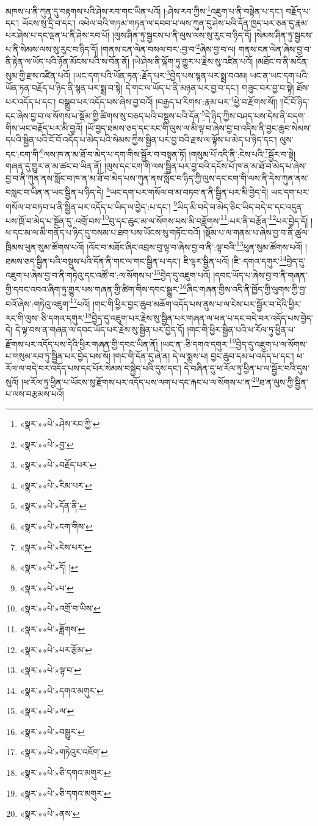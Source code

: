 མཁས་པ་ནི་ཀུན་དུ་བརྟགས་པའི་ཤེས་རབ་གང་ཡིན་པའོ། །:ཤེས་རབ་ཀྱིས་\footnote{«སྣར་»«པེ་»ཤེས་རབ་ཀྱི་}འཇུག་པ་ནི་བསྟེན་པ་དང་། བརྗོད་པ་དང་། ཡོངས་སུ་དྲི་བ་དང་། འཕེལ་བའི་གཏམ་གཏན་ལ་དབབ་པ་ལས་ཀུན་དུ་ཤེས་པའི་དོན་ཁྱད་པར་ཅན་དུ་རྣམ་པར་ཤེས་པ་དང་ལྡན་པ་ནི་ཤེས་རབ་པོ། །ལུས་ཤིན་ཏུ་སྦྱངས་པ་ནི་ལུས་ལས་སུ་རུང་བ་ཉིད་དོ། །སེམས་ཤིན་ཏུ་སྦྱངས་པ་ནི་སེམས་ལས་སུ་རུང་བ་ཉིད་དོ། །གནས་ངན་ལེན་བསལ་བར་:བྱ་བ་\footnote{«སྣར་»«པེ་»བྱ་}ཞེས་བྱ་བ་ལ། གནས་ངན་ལེན་ཞེས་བྱ་བ་ནི་རྟེན་ལ་ཡོད་པའི་ཉོན་མོངས་པའི་ས་བོན་ནོ། །ཡེ་ཤེས་ནི་ལྐོག་ཏུ་གྱུར་པ་རྗེས་སུ་འཛིན་པའོ། །མཐོང་བ་ནི་མངོན་སུམ་གྱི་རྫས་འཛིན་པའོ། །ཡང་དག་པའི་ཡོན་ཏན་:རྗོད་པར་\footnote{«སྣར་»«པེ་»བརྗོད་པར་}བྱེད་པས་སྙན་པར་སྨྲ་བའམ། ཡང་ན་ཡང་དག་པའི་ཡོན་ཏན་བརྗོད་པ་ཉིད་ནི་སྙན་པར་སྨྲ་བ་སྟེ། དེ་གང་ལ་ཡོད་པ་ནི་མཉན་པར་བྱ་བ་དང་། གཟུང་བར་བྱ་བ་སྟེ། ཐོས་པར་འདོད་པ་དང་། བསྒྲུབ་པར་འདོད་པས་ཞེས་བྱ་བའོ། །བརྒྱད་པ་རིགས་:རྣམ་པར་\footnote{«སྣར་»«པེ་»རིམ་པར་}ཕྱེ་བ་རྫོགས་སོ།། །།ངོ་བོ་ཉིད་དང་ཞེས་བྱ་བ་ལ་སོགས་པ་སྡོམ་གྱི་ཚིགས་སུ་བཅད་པའི་བསྡུས་པའི་དོན་\footnote{«སྣར་»«པེ་»དོན་ནི་}དེ་ཉིད་ཀྱིས་བཤད་པས་དེས་ནི་བདག་གིས་ཡང་བརྗོད་པར་མི་བྱའོ། །ཡོ་བྱད་ཐམས་ཅད་དང་རང་གི་ལུས་ལ་མི་ལྟ་བ་ཞེས་བྱ་བ་འདིས་ནི་བྱང་ཆུབ་སེམས་དཔའི་སྦྱིན་པའི་ངོ་བོ་འདོད་པ་མེད་པའི་སེམས་ཀྱིས་སྦྱིན་པར་བྱ་བའི་རྫས་ལ་ལྟོས་པ་མེད་པ་ཉིད་དང་། ལུས་དང་:ངག་གི་\footnote{«སྣར་»«པེ་»ངག་གིས་}ལས་ཁ་ན་མ་ཐོ་བ་མེད་པ་དག་གིས་སྦྱོར་བ་བསྟན་ཏོ། །གསུམ་པོ་འདི་ནི་:ངེས་པའི་\footnote{«སྣར་»«པེ་»ངེས་པར་}སྦྱོར་བ་སྟེ། གཞན་དུ་གྱུར་ན་མ་ཚང་བ་ཡིན་ནོ། །ལུས་དང་ངག་གི་ལས་སྦྱིན་པར་བྱ་བའི་དངོས་པོ་ཁ་ན་མ་ཐོ་བ་མེད་པ་ཞེས་བྱ་བ་ནི་ཀུན་ནས་སློང་བ་ཁ་ན་མ་ཐོ་བ་མེད་པས་ཀུན་ནས་སློང་བ་ཉིད་ཀྱི་ལུས་དང་ངག་གི་ལས་ནི་དེས་ཀུན་ནས་བསླང་བ་ཡིན་ན་ཡང་སྦྱིན་པ་ཉིད་དེ། \footnote{«སྣར་»«པེ་»དོ། ། }ཡང་དག་པར་གསོལ་བ་མ་བཏབ་ན་ནི་སྦྱིན་པར་མི་བྱེད་དེ། ཡང་དག་པར་གསོལ་བ་བཏབ་པ་ནི་སྦྱིན་པར་འདོད་པ་ཡིད་ལ་བྱེད་:པ་དང་། \footnote{«སྣར་»«པེ་»པ་}ཡིད་མི་བདེ་བ་མེད་ཅིང་ཡིད་བདེ་བ་དང་འདུན་པས་ཁྲོ་བ་མེད་པ་སྔོན་དུ་:འགྲོ་བས་\footnote{«སྣར་»«པེ་»འགྲོ་བ་ཡིས་}བུ་དང་ཆུང་མ་ལ་སོགས་པས་མི་བཟློགས་\footnote{«སྣར་»«པེ་»ཟློགས་}:པར་ནི་བརྩོན་\footnote{«སྣར་»«པེ་»པར་རྩོམ་}པར་བྱེད་དོ། །ཕ་དང་མ་ལ་མི་གནོད་པ་ཉིད་དུ་བསམ་པ་ཐག་པས་ཡོངས་སུ་གཏོང་བའོ། །སྡོམ་པ་ལ་གནས་པ་ཞེས་བྱ་བ་ནི་ཚུལ་ཁྲིམས་ཕུན་སུམ་ཚོགས་པའོ། །འོང་བ་མཐོང་ཞིང་འབྲས་བུ་ལྟ་བ་ཞེས་བྱ་བ་ནི་:ལྟ་བའི་\footnote{«སྣར་»«པེ་»ལྟ་བ་}ཕུན་སུམ་ཚོགས་པའོ། །ཐམས་ཅད་སྦྱིན་པའི་བསྡུས་པའི་དོན་ནི་གང་ལ་གང་སྦྱིན་པ་དང་། ཇི་ལྟར་སྦྱིན་པའོ། །ཇི་:དགའ་དགུར་\footnote{«སྣར་»«པེ་»དགའ་མགུར་}བྱེད་དུ་འཇུག་པ་ཞེས་བྱ་བ་ནི་གཏེའུ་དང་འཚོ་བ་:ལ་སོགས་པ་\footnote{«སྣར་»«པེ་»ལ་}བྱེད་དུ་འཇུག་པའོ། །དབང་ཡོད་པ་ཞེས་བྱ་བ་ནི་གཞན་གྱི་དབང་འབའ་ཞིག་ཏུ་གྱུར་པས་གཞན་གྱི་ཚིག་གིས་དབང་སྒྱུར་\footnote{«སྣར་»«པེ་»བསྒྱུར་}ཞིང་གཞན་གྱིས་འདི་ནི་ཁྱོད་ཀྱི་ལུགས་ཀྱི་བྱ་བའོ་ཞེས་:གཏེའུ་འཇུག་\footnote{«སྣར་»«པེ་»གཏེའུར་འཇོག་}པའོ། །གང་གི་ཕྱིར་བྱང་ཆུབ་མཆོག་འདོད་པས་ནུས་པ་ལ་ངེས་པར་སྦྱོར་བ་དེའི་ཕྱིར་རང་གི་ལུས་:ཅི་དགའ་དགུར་\footnote{«སྣར་»«པེ་»ཅི་དགའ་མགུར་}བྱེད་དུ་འཇུག་པར་རྗེས་སུ་སྦྱིན་པར་གཞན་ལ་ཕན་པ་དང་བདེ་བར་འདོད་པས་བྱེད་དེ། དེ་ལྟ་བས་ན་གཞན་ལ་དབང་ཡོད་པར་རྗེས་སུ་སྦྱིན་པར་བྱེད་དོ། །གང་གི་ཕྱིར་སྦྱིན་པའི་ཕ་རོལ་ཏུ་ཕྱིན་པ་རྫོགས་པར་འདོད་པས་དེའི་ཕྱིར་གཞན་གྱི་དབང་ཡིན་ནོ། །ཡང་ན་:ཅི་དགའ་དགུར་\footnote{«སྣར་»«པེ་»ཅི་དགའ་མགུར་}བྱེད་དུ་འཇུག་པ་ལ་སོགས་པ་གསུམ་རབ་ཏུ་སྦྱིན་པར་བྱེད་པས་སོ། །གང་གི་དོན་དུ་ཞེ་ན། དེ་ལ་སྨྲས་པ། བྱང་ཆུབ་དམ་པ་འདོད་པ་དང་། ཕ་རོལ་ལ་བདེ་བར་འདོད་པས་དང་པོར་སེམས་བསྐྱེད་པའི་དུས་དང་། དེ་བཞིན་དུ་ཕ་རོལ་ཏུ་ཕྱིན་པ་ལ་སྦྱོར་བའི་དུས་སུའོ། །ཕ་རོལ་ཏུ་ཕྱིན་པ་ཡོངས་སུ་རྫོགས་པར་འདོད་པས་ལག་པ་དང་རྐང་པ་ལ་སོགས་པ་ན་\footnote{«སྣར་»«པེ་»ནས་}ཐ་ན་ལུས་ཀྱི་སྦྱིན་པ་ལས་བརྩམས་པའོ། 